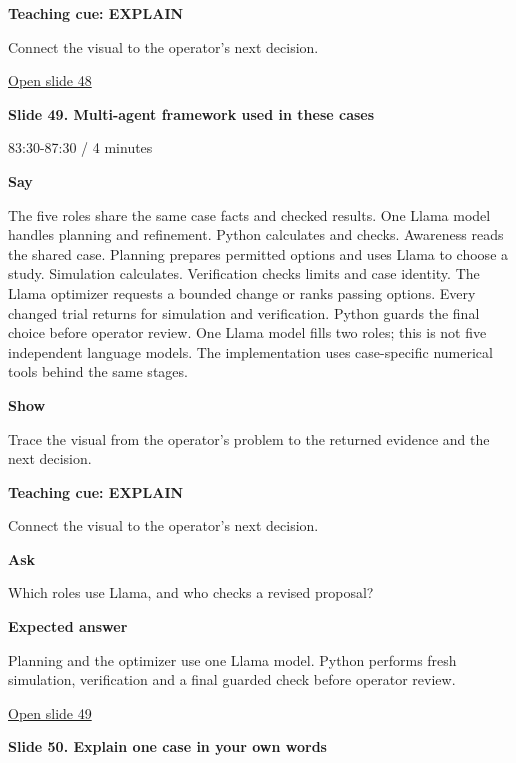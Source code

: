\documentclass[12pt,letterpaper]{article}
\begin{document}
\textbf{Teaching cue: EXPLAIN}\par Connect the visual to the operator's next decision.\par\medskip
\vfill\href{https://alaaselim-sudo.github.io/GridGuard-Agentic-AI-Tutorials/operator-cases/#/48}{Open slide 48}\par
\clearpage{}
{\Large\bfseries\color{IEEEBlue} Slide 49. Multi-agent framework used in these cases\par}\medskip
{\small\color{Slate} 83:30-87:30 /\allowbreak{} 4 minutes\par}\medskip
\textbf{Say}\par The five roles share the same case facts and checked results. One Llama model handles planning and refinement. Python calculates and checks. Awareness reads the shared case. Planning prepares permitted options and uses Llama to choose a study. Simulation calculates. Verification checks limits and case identity. The Llama optimizer requests a bounded change or ranks passing options. Every changed trial returns for simulation and verification. Python guards the final choice before operator review. One Llama model fills two roles; this is not five independent language models. The implementation uses case-specific numerical tools behind the same stages.\par\medskip
\textbf{Show}\par Trace the visual from the operator's problem to the returned evidence and the next decision.\par\medskip
\textbf{Teaching cue: EXPLAIN}\par Connect the visual to the operator's next decision.\par\medskip
\textbf{Ask}\par Which roles use Llama, and who checks a revised proposal?\par\textbf{Expected answer}\par Planning and the optimizer use one Llama model. Python performs fresh simulation, verification and a final guarded check before operator review.\par\medskip
\vfill\href{https://alaaselim-sudo.github.io/GridGuard-Agentic-AI-Tutorials/operator-cases/#/49}{Open slide 49}\par
\clearpage{}
{\Large\bfseries\color{IEEEBlue} Slide 50. Explain one case in your own words\par}\medskip
\end{document}
